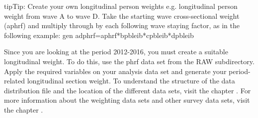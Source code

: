 \documentclass[letterpaper,10pt,openany,onesideH,english]{sphinxmanual}
\begin{document}

\begin{sphinxadmonition}{tip}{Tip:}
Create your own longitudinal person weights  e.g. longitudinal person weight from wave A to wave D. Take the starting wave cross-sectional weight (aphrf) and multiply through by each following wave staying factor, as in the following example:
gen adphrf=aphrf*bpbleib*cpbleib*dpbleib
\end{sphinxadmonition}

Since you are looking at the period 2012-2016, you must create a suitable longitudinal weight. To do this, use the phrf data set from the RAW subdirectory. Apply the required variables on your analysis data set and generate your period-related longitudinal section weight. To understand the structure of the data distribution file and the location of the different data sets, visit the chapter {\hyperref[\detokenize{Principles of Data Structure/index:datasets}]{}}. For more information about the weighting data sets and other survey data sets, visit the chapter {\hyperref[\detokenize{Principles of Data Structure/index:survey}]{}}.

%
\begin{sphinxVerbatim}[commandchars=\\\{\},numbers=left,firstnumber=1,stepnumber=1]
    
  
  
            
   
   
  
\end{sphinxVerbatim}
\end{document}
